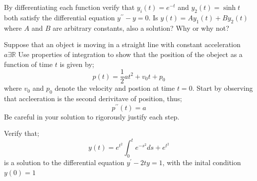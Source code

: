 \documentclass[12pt,letterpaper]{hmcpset}
\begin{document}
\section*{}






\begin{problem}[Problem 1]
By differentiating each function verify that $y_i(t)= e^{-t}$ and $y_2(t) = \sinh t$ both satisfy the differential equation $y^{\prime\prime}-y= 0$. Is $y(t) = Ay_1(t) +By_2(t)$ where $A$ and $B$ are arbitrary constants, also a solution? Why or why not?
\end{problem}
\newpage


\begin{problem}[2. ]
   Suppose that an object is moving in a straight line with constant acceleration $a \exists \mathbb{R}$ Use properties of integration to show that the position of the obeject as a function of time $t$ is given by; 
   $$ p(t) = \frac{1}{2}at^2+v_0t+p_0$$
   where $v_0$ and $p_0$ denote the velocity and postion at time $t=0$. Start by observing that accleeration is the second derivitave of position, thus; 
   $$ p^{\prime \prime} (t) = a$$
   Be careful in your solution to rigorously justify each step. 
\end{problem}

\begin{solution}
    \vfill
\end{solution}

\newpage


\begin{problem}[3]
   Verify that; 
   $$ y(t) = e^{t^2} \int_{0}^{t} e^{-s^2}ds+e^{t^2}$$
   is a solution to the differential equation $y^{\prime} -2ty = 1$, with the inital condition $y(0) = 1$
\end{problem}

\begin{solution}
    \vfill
\end{solution}

\newpage

\end{document}
